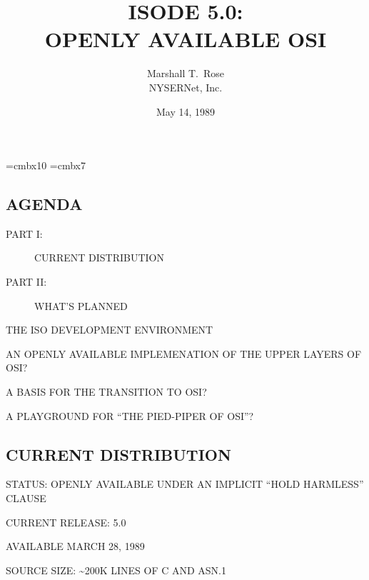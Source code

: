 

\font\xx=cmbx10
\font\yy=cmbx7

\raggedright


\let\tradeNAMfont=\relax
\let\tradeORGfont=\relax



\title	{ISODE 5.0:\\ OPENLY AVAILABLE OSI}
\author	{Marshall T.~Rose\\ NYSERNet, Inc.}
\date	{May 14, 1989}
\maketitlepage


\begin{bwslide}
\part*	{AGENDA}\bf

\begin{description}
\item[PART I:]		CURRENT DISTRIBUTION

\item[PART II:]		WHAT'S PLANNED
\end{description}
\end{bwslide}


\begin{bwslide}

\begin{nrtc}
\item	THE ISO DEVELOPMENT ENVIRONMENT

\item	AN OPENLY AVAILABLE IMPLEMENATION OF THE UPPER LAYERS OF OSI?

\item	A BASIS FOR THE TRANSITION TO OSI?

\item	A PLAYGROUND FOR ``THE PIED-PIPER OF OSI''?
\end{nrtc}
\end{bwslide}


\begin{bwslide}
\part	{CURRENT DISTRIBUTION}\bf

\begin{nrtc}
\item	STATUS: OPENLY AVAILABLE UNDER AN IMPLICIT ``HOLD HARMLESS'' CLAUSE

\item	CURRENT RELEASE: 5.0
    \begin{nrtc}
    \item	AVAILABLE MARCH 28, 1989
    \end{nrtc}

\item	SOURCE SIZE: \~{}200K LINES OF C AND ASN.1
\end{nrtc}
\end{bwslide}


